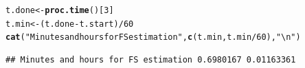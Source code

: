 \documentclass[9pt]{article}\usepackage[]{graphicx}\usepackage[]{xcolor}
\makeatletter
\newcommand{\hlnum}[1]{\textcolor[rgb]{0.686,0.059,0.569}{#1}}%
\newcommand{\hlstr}[1]{\textcolor[rgb]{0.192,0.494,0.8}{#1}}%
\newcommand{\hlopt}[1]{\textcolor[rgb]{0,0,0}{#1}}%
\newcommand{\hlstd}[1]{\textcolor[rgb]{0.345,0.345,0.345}{#1}}%
\newcommand{\hlkwb}[1]{\textcolor[rgb]{0.69,0.353,0.396}{#1}}%
\newcommand{\hlkwd}[1]{\textcolor[rgb]{0.737,0.353,0.396}{\textbf{#1}}}%
\newenvironment{kframe}{%
 \def\at@end@of@kframe{}%
 \ifinner\ifhmode%
  \def\at@end@of@kframe{\end{minipage}}%
  \begin{minipage}{\columnwidth}%
 \fi\fi%
 \def\FrameCommand##1{\hskip\@totalleftmargin \hskip-\fboxsep
 \colorbox{shadecolor}{##1}\hskip-\fboxsep
     \hskip-\linewidth \hskip-\@totalleftmargin \hskip\columnwidth}%
 \MakeFramed {\advance\hsize-\width
   \@totalleftmargin\z@ \linewidth\hsize
   \@setminipage}}%
 {\par\unskip\endMakeFramed%
 \at@end@of@kframe}
\newenvironment{knitrout}{}{} %
\theoremstyle{definition}
\theoremstyle{remark}
\makeatother
\begin{document}
\begin{knitrout}
\color{fgcolor}\begin{kframe}
\begin{alltt}
\hlstd{t.done} \hlkwb{<-} \hlkwd{proc.time}\hlstd{()[}\hlnum{3}\hlstd{]}
\hlstd{t.min} \hlkwb{<-} \hlstd{(t.done} \hlopt{-} \hlstd{t.start)}\hlopt{/}\hlnum{60}
\hlkwd{cat}\hlstd{(}\hlstr{"Minutes and hours for FS estimation"}\hlstd{,} \hlkwd{c}\hlstd{(t.min, t.min}\hlopt{/}\hlnum{60}\hlstd{),} \hlstr{"\textbackslash{}n"}\hlstd{)}
\end{alltt}
\begin{verbatim}
## Minutes and hours for FS estimation 0.6980167 0.01163361
\end{verbatim}
\end{kframe}
\end{knitrout}


\end{document}
